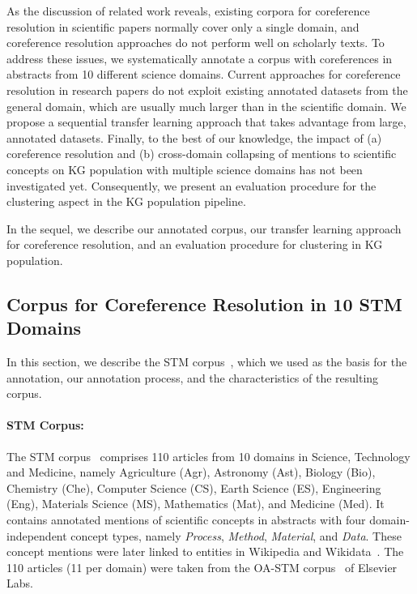 \documentclass[runningheads]{llncs}
\begin{document}
As the discussion of related work reveals, existing corpora for coreference resolution in scientific papers normally cover only a single domain, and coreference resolution approaches do not perform well on scholarly texts. To address these issues, we systematically annotate a corpus with coreferences in abstracts from 10 different science domains.
Current approaches for coreference resolution in research papers do not exploit existing annotated datasets from the general domain, which are usually much larger than in the scientific domain. We propose a sequential transfer learning approach that takes advantage from large, annotated datasets.
Finally, to the best of our knowledge, the impact of (a) coreference resolution and (b) cross-domain collapsing of mentions to scientific concepts on KG population with multiple science domains has not been investigated yet. Consequently, we present an evaluation procedure for the clustering aspect in the KG population pipeline.

In the sequel, we describe our annotated corpus, our transfer learning approach for coreference resolution, and an evaluation procedure for clustering in KG population.

\subsection{Corpus for Coreference Resolution in 10 STM Domains}
In this section, we describe the STM corpus~\cite{Brack2020DomainindependentEO}, which we used as the basis for the annotation, our annotation process, and the characteristics of the resulting corpus.

\paragraph{STM Corpus:}
The STM corpus~\cite{Brack2020DomainindependentEO} comprises 110  articles from 10 domains in Science, Technology and Medicine, namely Agriculture (Agr), Astronomy (Ast), Biology (Bio), Chemistry (Che), Computer Science (CS), Earth Science (ES), Engineering (Eng), Materials Science (MS), Mathematics (Mat), and Medicine (Med). 
It contains annotated mentions of scientific concepts in abstracts with four domain-independent concept types, namely \textit{Process}, \textit{Method}, \textit{Material}, and \textit{Data}. These concept mentions were later linked to entities in Wikipedia and Wikidata~\cite{DSouza2020STEM}. 
The 110 articles (11 per domain) were taken from the OA-STM corpus~\cite{OASTM} of Elsevier Labs.
\end{document}
